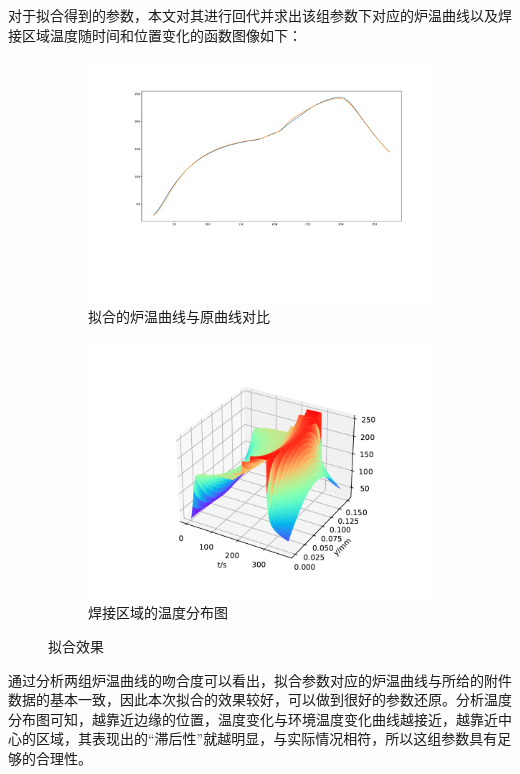 \documentclass[../main.tex]{subfiles}
\begin{document}
对于拟合得到的参数，本文对其进行回代并求出该组参数下对应的炉温曲线以及焊接区域温度随时间和位置变化的函数图像如下：
\begin{figure}[H]
\centering
\begin{subfigure}[b]{0.49\textwidth}
\centering
\includegraphics[width=\textwidth]{same.pdf}
\caption{拟合的炉温曲线与原曲线对比}
\end{subfigure}
%
\begin{subfigure}[b]{0.49\textwidth}
\centering
\includegraphics[width=\textwidth]{rainbow.pdf}
\caption{焊接区域的温度分布图}
\end{subfigure}
\caption{拟合效果}\label{fig:two}
\end{figure}
通过分析两组炉温曲线的吻合度可以看出，拟合参数对应的炉温曲线与所给的附件数据的基本一致，因此本次拟合的效果较好，可以做到很好的参数还原。分析温度分布图可知，越靠近边缘的位置，温度变化与环境温度变化曲线越接近，越靠近中心的区域，其表现出的``滞后性''就越明显，与实际情况相符，所以这组参数具有足够的合理性。
\end{document}
